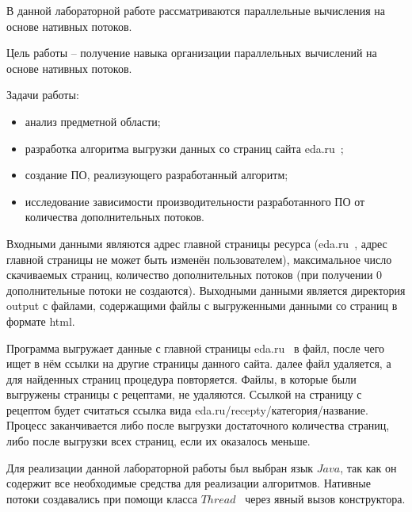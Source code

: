 

В данной лабораторной работе рассматриваются параллельные вычисления на основе нативных потоков.

Цель работы -- получение навыка организации параллельных вычислений на основе нативных потоков. 

Задачи работы: 
\begin{itemize}
    \item анализ предметной области;
    \item разработка алгоритма выгрузки данных со страниц сайта eda.ru~\cite{eda};
    \item создание ПО, реализующего разработанный алгоритм;
    \item исследование зависимости производительности разработанного ПО от количества дополнительных потоков.
\end{itemize}


Входными данными являются адрес главной страницы ресурса (eda.ru~\cite{eda}, адрес главной страницы не может быть изменён пользователем), максимальное число скачиваемых страниц, количество дополнительных потоков (при получении 0 дополнительные потоки не создаются). Выходными данными является директория output с файлами, содержащими файлы с выгруженными данными со страниц в формате html.

 
Программа выгружает данные с главной страницы eda.ru~\cite{eda} в файл, после чего ищет в нём ссылки на другие страницы данного сайта. далее файл удаляется, а для найденных страниц процедура повторяется. Файлы, в которые были выгружены страницы с рецептами, не удаляются. Ссылкой на страницу с рецептом будет считаться ссылка вида eda.ru/recepty/категория/название. Процесс заканчивается либо после выгрузки достаточного количества страниц, либо после выгрузки всех страниц, если их оказалось меньше.


Для реализации данной лабораторной работы был выбран язык $Java$, так как он содержит все необходимые средства для реализации алгоритмов. Нативные потоки создавались при помощи класса $Thread$~\cite{thread} через явный вызов конструктора.

